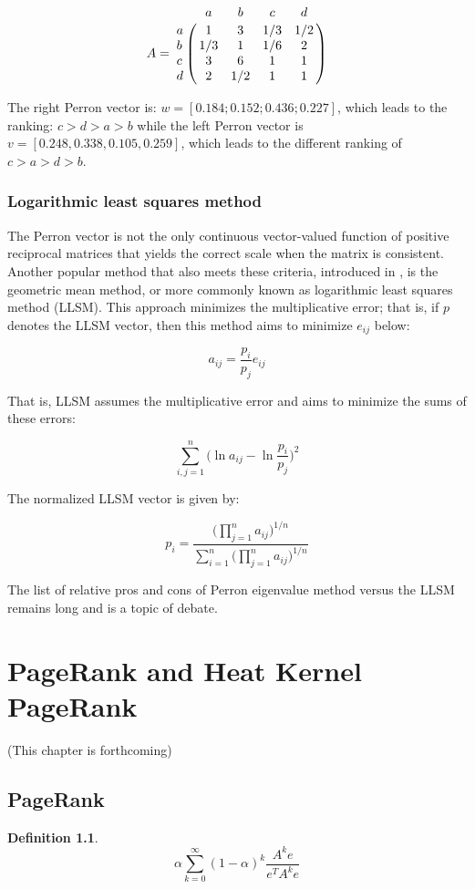 \documentclass[a4,11pt,twoside,leqno]{report}
\theoremstyle{definition}
\newtheorem{defn}[thm]{Definition}
\theoremstyle{remark}
\numberwithin{equation}{section}
\begin{document}
$$A=\bordermatrix{\ & a & b & c & d \cr a & 1 & 3 & 1/3 & 1/2  \cr b & 1/3 & 1 & 1/6 & 2 \cr c & 3 & 6 & 1 &1\cr d & 2 & 1/2 & 1 & 1}$$

\vspace{5mm}

The right Perron vector is: $w=[0.184; 0.152; 0.436; 0.227]$, which leads to the ranking: $c>d >a >b$ while the left Perron vector is $v=[0.248, 0.338, 0.105, 0.259]$, which leads to the different ranking of $c>a>d>b$.

\subsection{Logarithmic least squares method}

The Perron vector is not the only continuous vector-valued function of positive reciprocal matrices that yields the correct scale when the matrix is consistent. Another popular method that also meets these criteria, introduced in \cite{crawford}, is the geometric mean method, or more commonly known as logarithmic least squares method (LLSM). This approach minimizes the multiplicative error; that is, if $p$ denotes the LLSM vector, then this method aims to minimize $e_{ij}$ below:

$$a_{ij}=\frac{p_i}{p_j}e_{ij}$$

That is, LLSM assumes the multiplicative error and aims to minimize the sums of these errors:

$$\displaystyle \sum_{i,j=1}^n \big(\ln{a_{ij}}-\ln{\frac{p_i}{p_j}}\big)^2$$


The normalized LLSM vector is given by:

$$p_i= \frac{\displaystyle\Big(\prod_{j=1}^n a_{ij}\Big)^{1/n}}{\displaystyle \sum_{i=1}^{n}\Big(\prod_{j=1}^n a_{ij}\Big)^{1/n}}$$

The list of relative pros and cons of Perron eigenvalue method versus the LLSM remains long and is a topic of debate. 


\chapter{PageRank and Heat Kernel PageRank}

(This chapter is forthcoming)

\section{PageRank}

\begin{defn}

$$\alpha \displaystyle \sum_{k=0}^{\infty} (1-\alpha)^k \frac{A^ke}{e^TA^ke}$$

\end{defn}
\end{document}
